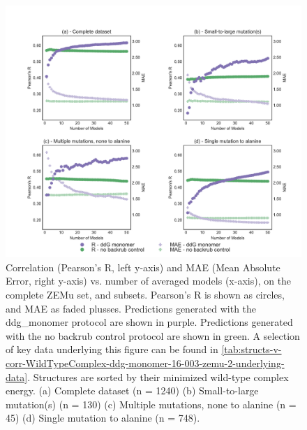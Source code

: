 \begin{figure}
  \includegraphics[width=\textwidth,keepaspectratio]{structs-v-corr-WildTypeComplex-ddg-monomer-16-003-zemu-2.pdf}
  \caption[]{
    Correlation (Pearson's R, left y-axis) and MAE (Mean Absolute Error, right y-axis) vs. number of averaged models (x-axis), on the complete ZEMu set, and subsets.
    Pearson's R is shown as circles, and MAE as faded plusses.
Predictions generated with the ddg\_monomer protocol are shown in purple.
Predictions generated with the no backrub control protocol are shown in green.
    A selection of key data underlying this figure can be found in \cref{tab:structs-v-corr-WildTypeComplex-ddg-monomer-16-003-zemu-2-underlying-data}.
    Structures are sorted by their minimized wild-type complex energy. 
    (a) Complete dataset (n = 1240)
    (b) Small-to-large mutation(s) (n = 130)
    (c) Multiple mutations, none to alanine (n = 45)
    (d) Single mutation to alanine (n = 748).
  } \label{fig:structs-v-corr-WildTypeComplex-ddg-monomer-16-003-zemu-2}
\end{figure}
